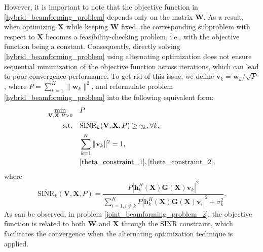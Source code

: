 However, it is important to note that the objective function in \eqref{hybrid_beamforming_problem} depends only on the matrix $\mathbf{W}$. As a result, when optimizing $\mathbf{X}$ while keeping $\mathbf{W}$ fixed, the corresponding subproblem with respect to $\mathbf{X}$ becomes a feasibility-checking problem, i.e., with the objective function being a constant. Consequently, directly solving \eqref{hybrid_beamforming_problem} using alternating optimization does not ensure sequential minimization of the objective function across iterations, which can lead to poor convergence performance. To get rid of this issue, we define $\mathbf{v}_k = \mathbf{w}_k/\sqrt{P}$, where $P = \sum_{k=1}^K \|\mathbf{w}_k\|^2$, and reformulate problem \eqref{hybrid_beamforming_problem} into the following equivalent form:   
\begin{subequations} \label{joint_beamforming_problem_2}
    \begin{align}
        \min_{\mathbf{V}, \mathbf{X}, P > 0} \quad & P \\
        \mathrm{s.t.} \quad & \overline{\mathrm{SINR}}_k(\mathbf{V}, \mathbf{X}, P)  \ge \gamma_k, \forall k, \\
        \label{unit_power_constraint}
        & \sum_{k=1}^K \| \mathbf{v}_k \|^2 = 1, \\
        & \eqref{theta_constraint_1}, \eqref{theta_constraint_2},
    \end{align}
\end{subequations}
where 
\begin{equation}
    \overline{\mathrm{SINR}}_k(\mathbf{V}, \mathbf{X}, P) = \frac{ P \left| \mathbf{h}_k^H(\mathbf{X}) \mathbf{G}(\mathbf{X}) \mathbf{v}_k \right|^2 }{\sum_{i = 1, i \neq k}^K P \left| \mathbf{h}_k^H(\mathbf{X}) \mathbf{G}(\mathbf{X}) \mathbf{v}_i \right|^2 + \sigma_k^2 }.
\end{equation}
As can be observed, in problem \eqref{joint_beamforming_problem_2}, the objective function is related to both $\mathbf{W}$ and $\mathbf{X}$ through the SINR constraint, which facilitates the convergence when the alternating optimization technique is applied. 

